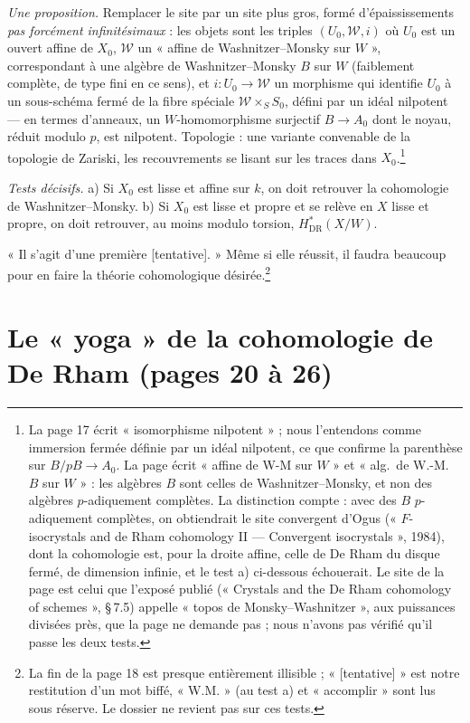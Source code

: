 \documentclass[11pt,a4paper]{article}
\begin{document}
\emph{Une proposition.} Remplacer le site par un site plus gros, formé
d'épaississements \emph{pas forcément infinitésimaux} : les objets sont les
triples $(U_0, \mathcal{W}, i)$ où $U_0$ est un ouvert affine de $X_0$,
$\mathcal{W}$ un « affine de Washnitzer--Monsky sur $W$ », correspondant à une
algèbre de Washnitzer--Monsky $B$ sur $W$ (faiblement complète, de type fini
en ce sens),
et $i : U_0 \to \mathcal{W}$ un morphisme qui identifie $U_0$ à un
sous-schéma fermé de la fibre spéciale $\mathcal{W} \times_S S_0$, défini
par un idéal nilpotent — en termes d'anneaux, un $W$-homomorphisme surjectif
$B \to A_0$ dont le noyau, réduit modulo $p$, est nilpotent. Topologie : une
variante convenable de la topologie de Zariski, les recouvrements se
lisant sur les traces dans $X_0$.\footnote{La page 17 écrit « isomorphisme
nilpotent » ; nous l'entendons comme immersion fermée définie par un idéal
nilpotent, ce que confirme la parenthèse sur $B/pB \to A_0$. La page écrit
« affine de W-M sur $W$ » et « alg.\ de W.-M.\ $B$ sur $W$ » : les algèbres $B$
sont celles de Washnitzer--Monsky, et non des algèbres $p$-adiquement
complètes. La distinction compte : avec des $B$ $p$-adiquement complètes, on
obtiendrait le site convergent d'Ogus (« $F$-isocrystals and de Rham
cohomology II — Convergent isocrystals », 1984), dont la cohomologie est, pour
la droite affine, celle de De Rham du disque fermé, de dimension infinie, et le
test a) ci-dessous échouerait. Le site de la page est celui que l'exposé publié
(« Crystals and the De Rham cohomology of schemes », §\,7.5) appelle « topos de
Monsky--Washnitzer », aux puissances divisées près, que la page ne demande
pas ; nous n'avons pas vérifié qu'il passe les deux tests.}

\emph{Tests décisifs.}
a) Si $X_0$ est lisse et affine sur $k$, on doit retrouver la cohomologie de
Washnitzer--Monsky.
b) Si $X_0$ est lisse et propre et se relève en $X$ lisse et propre, on doit
retrouver, au moins modulo torsion, $H^{*}_{\mathrm{DR}}(X/W)$.

« Il s'agit d'une première [tentative]. » Même si elle réussit, il faudra
beaucoup pour en faire la théorie cohomologique désirée.\footnote{La fin de
la page 18 est presque entièrement illisible ; « [tentative] » est notre
restitution d'un mot biffé, « W.M. » (au test a) et « accomplir » sont lus
sous réserve. Le dossier ne revient pas sur ces tests.}

\section*{Le « yoga » de la cohomologie de De Rham (pages 20 à 26)}
\end{document}
